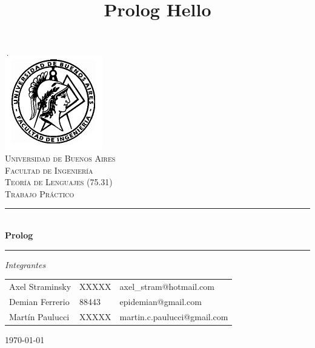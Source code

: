 \documentclass[12pt,titlepage]{report}
\begin{document}


\pagestyle{fancy}
\renewcommand{\sectionmark}[1]{\markboth{}{\thesection\ \ #1}}
\lhead{}
\chead{}
\rhead{\rightmark}
\lfoot{}
\cfoot{}
\rfoot{\thepage}



\title{Prolog Hello}
\author{}



\begin{titlepage}

\thispagestyle{empty}

\begin{center}
\includegraphics[scale=0.55]{./fiuba}\\
\textsc{\Large Universidad de Buenos Aires}\\[0.2cm]
\textsc{\Large Facultad de Ingeniería}\\[1.5cm]


\textsc{\large Teoría de Lenguajes (75.31)} \\[0.3cm]
\textsc{\large Trabajo Práctico}

\rule{\linewidth}{0.5mm} \\[0.4cm]
{\huge \bfseries Prolog} \\
\rule{\linewidth}{0.5mm}

\begin{flushleft}
\Large\emph{Integrantes} \\[0.2cm]


\begin{tabular}{lll}
Axel Straminsky & XXXXX & axel\_stram@hotmail.com \\
Demian Ferrerio & 88443 & epidemian@gmail.com \\
Martín Paulucci & XXXXX & martin.c.paulucci@gmail.com \\
\end{tabular}
\end{flushleft}

\vfill

{\large \today}

\end{center}
\end{titlepage}
\end{document}
